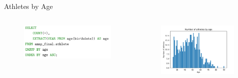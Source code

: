 \documentclass[aspectratio=169, xcolor=dvipsnames]{beamer}
\begin{document}
\begin{frame}{Athletes by Age}
\begin{columns}[c]
\begin{column}{.5\textwidth}
\begin{figure}
    \centering
    \includegraphics[width=\textwidth]{img/sql/athletesbyage.png}
\end{figure}
\end{column}

\begin{column}{.5\textwidth}
\begin{figure}
    \centering
    \includegraphics[width=\textwidth]{img/athletesbyage.png}
\end{figure}
\end{column}
\end{columns}
\end{frame}
\end{document}
